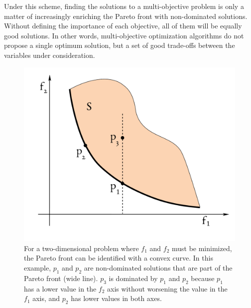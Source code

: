 Under this scheme, finding the solutions to a multi-objective problem is only a matter of increasingly enriching the Pareto front with non-dominated solutions. Without defining the importance of each objective, all of them will be equally good solutions. In other words, multi-objective optimization algorithms do not propose a single optimum solution, but a set of good trade-offs between the variables under consideration.\cite{coello2007evolutionary}


\begin{figure}[H]
	\includegraphics[width=\textwidth]{./figures/02/FrentePareto.pdf}
	\caption[A Pareto front for two dimensions]{For a two-dimensional problem where $f_{1}$ and $f_{2}$ must be minimized, the Pareto front can be identified with a convex curve. In this example, $p_{1}$ and $p_{2}$ are non-dominated solutions that are part of the Pareto front (wide line). $p_{3}$ is dominated by $p_{1}$ and $p_{2}$ because $p_{1}$ has a lower value in the $f_{2}$ axis without worsening the value in the $f_{1}$ axis, and $p_{2}$ has lower values in both axes.}
	\label{fig:pareto}
\end{figure}



